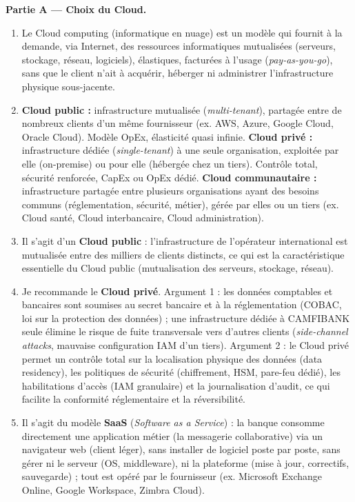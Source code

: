 \documentclass[11pt]{article}
\newcommand{\cle}[1]{{\popxbold\color{popdark}#1}}
\begin{document}
\begin{corrige}
\textbf{Partie A — Choix du Cloud.}
\begin{enumerate}
    \item Le \cle{Cloud computing} (informatique en nuage) est un modèle qui fournit à la demande, via Internet, des ressources informatiques mutualisées (serveurs, stockage, réseau, logiciels), élastiques, facturées à l'usage (\emph{pay-as-you-go}), sans que le client n'ait à acquérir, héberger ni administrer l'infrastructure physique sous-jacente.
    \item \textbf{Cloud public :} infrastructure mutualisée (\emph{multi-tenant}), partagée entre de nombreux clients d'un même fournisseur (ex. AWS, Azure, Google Cloud, Oracle Cloud). Modèle OpEx, élasticité quasi infinie. \textbf{Cloud privé :} infrastructure dédiée (\emph{single-tenant}) à une seule organisation, exploitée par elle (on-premise) ou pour elle (hébergée chez un tiers). Contrôle total, sécurité renforcée, CapEx ou OpEx dédié. \textbf{Cloud communautaire :} infrastructure partagée entre plusieurs organisations ayant des besoins communs (réglementation, sécurité, métier), gérée par elles ou un tiers (ex. Cloud santé, Cloud interbancaire, Cloud administration).
    \item Il s'agit d'un \textbf{Cloud public} : l'infrastructure de l'opérateur international est mutualisée entre des milliers de clients distincts, ce qui est la caractéristique essentielle du Cloud public (mutualisation des serveurs, stockage, réseau).
    \item Je recommande le \textbf{Cloud privé}. Argument 1 : les données comptables et bancaires sont soumises au secret bancaire et à la réglementation (COBAC, loi sur la protection des données) ; une infrastructure dédiée à CAMFIBANK seule élimine le risque de fuite transversale vers d'autres clients (\emph{side-channel attacks}, mauvaise configuration IAM d'un tiers). Argument 2 : le Cloud privé permet un contrôle total sur la localisation physique des données (data residency), les politiques de sécurité (chiffrement, HSM, pare-feu dédié), les habilitations d'accès (IAM granulaire) et la journalisation d'audit, ce qui facilite la conformité réglementaire et la réversibilité.
    \item Il s'agit du modèle \textbf{SaaS} (\emph{Software as a Service}) : la banque consomme directement une application métier (la messagerie collaborative) via un navigateur web (client léger), sans installer de logiciel poste par poste, sans gérer ni le serveur (OS, middleware), ni la plateforme (mise à jour, correctifs, sauvegarde) ; tout est opéré par le fournisseur (ex. Microsoft Exchange Online, Google Workspace, Zimbra Cloud).

\end{enumerate}
\end{corrige}
\end{document}
